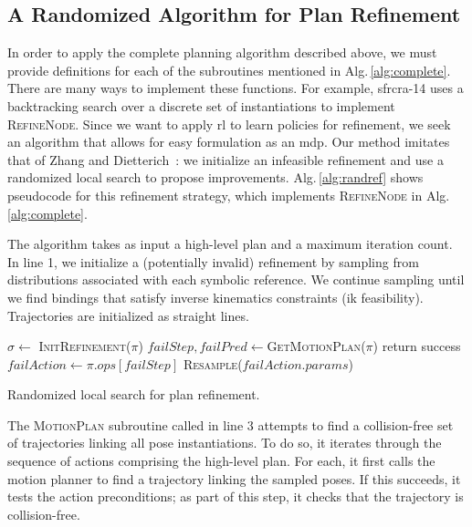 \subsection{A Randomized Algorithm for Plan Refinement}
In order to apply the complete planning algorithm described above, we must provide definitions for each of the subroutines mentioned in Alg.\,\ref{alg:complete}. There are many ways to implement these functions. For example, {\sc sfrcra-14} uses a backtracking search over a discrete set of instantiations to implement \textsc{RefineNode}. Since we want to apply {\sc rl} to learn policies for refinement,
we seek an algorithm that allows for easy formulation as an {\sc mdp}. Our method
imitates that of Zhang and Dietterich~\cite{JobShopSched}:
we initialize an infeasible refinement and use a randomized local search to propose
improvements. Alg.\,\ref{alg:randref} shows pseudocode for this refinement strategy,
which implements \textsc{RefineNode} in Alg.\,\ref{alg:complete}.

The algorithm takes as input a high-level plan and a maximum iteration count.
In line 1, we initialize a (potentially invalid) refinement by sampling from distributions associated
with each symbolic reference. We continue sampling
until we find bindings that satisfy inverse kinematics constraints ({\sc ik} feasibility). Trajectories are
initialized as straight lines.

\begin{algorithm}[t]
\begin{small}
  \SetAlgoLined
  \DontPrintSemicolon
   {
  \nl $\sigma \leftarrow$ \textsc{InitRefinement}($\pi$)\;
  \nl {} {
  \nl $failStep, failPred \leftarrow $\textsc{GetMotionPlan}($\pi$)\;
  \nl {} {
  \nl return success }
  \nl {} {
  \nl $failAction \leftarrow \pi.ops[failStep]$\;
  \nl \textsc{Resample}($failAction.params$) }
  \nl {} }}

\end{small}
\caption{Randomized local search for plan refinement.}
\label{alg:randref}
\end{algorithm}

The \textsc{MotionPlan} subroutine called in line 3 attempts to
find a collision-free set of trajectories linking all pose instantiations.
To do so, it iterates through the sequence of actions comprising the high-level plan.
For each, it first calls the motion planner to find a trajectory
linking the sampled poses. If this succeeds, it tests the action preconditions;
as part of this step, it checks that the trajectory is collision-free.

